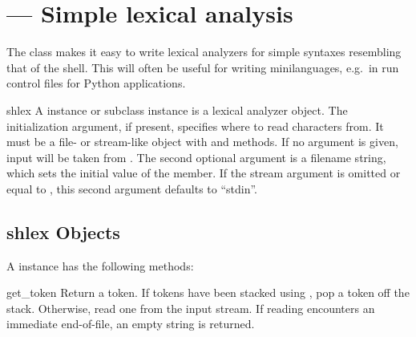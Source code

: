 \section{ ---
         Simple lexical analysis}



The  class makes it easy to write lexical analyzers for
simple syntaxes resembling that of the \UNIX{} shell.  This will often
be useful for writing minilanguages, e.g.\ in run control files for
Python applications.

\begin{classdesc}{shlex}{}
A  instance or subclass instance is a lexical analyzer
object.  The initialization argument, if present, specifies where to
read characters from. It must be a file- or stream-like object with
 and  methods.  If no argument is given,
input will be taken from .  The second optional 
argument is a filename string, which sets the initial value of the
 member.  If the stream argument is omitted or
equal to , this second argument defaults to ``stdin''.
\end{classdesc}


\begin{seealso}
\end{seealso}


\subsection{shlex Objects \label{shlex-objects}}

A  instance has the following methods:


\begin{methoddesc}{get_token}{}
Return a token.  If tokens have been stacked using
, pop a token off the stack.  Otherwise, read one
from the input stream.  If reading encounters an immediate
end-of-file, an empty string is returned. 
\end{methoddesc}

